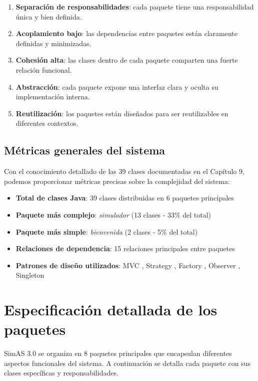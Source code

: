 \begin{enumerate}
    \item \textbf{Separación de responsabilidades}: cada paquete tiene una responsabilidad única y bien definida.
    \item \textbf{Acoplamiento bajo}: las dependencias entre paquetes están claramente definidas y minimizadas.
    \item \textbf{Cohesión alta}: las clases dentro de cada paquete comparten una fuerte relación funcional.
    \item \textbf{Abstracción}: cada paquete expone una interfaz clara y oculta su implementación interna.
    \item \textbf{Reutilización}: los paquetes están diseñados para ser reutilizables en diferentes contextos.
\end{enumerate}

\subsection{Métricas generales del sistema}

Con el conocimiento detallado de las 39 clases documentadas en el Capítulo 9, podemos proporcionar métricas precisas sobre la complejidad del sistema:

\begin{itemize}
    \item \textbf{Total de clases Java}: 39 clases distribuidas en 6 paquetes principales
    \item \textbf{Paquete más complejo}: \textit{simulador} (13 clases - 33\% del total)
    \item \textbf{Paquete más simple}: \textit{bienvenida} (2 clases - 5\% del total)
    \item \textbf{Relaciones de dependencia}: 15 relaciones principales entre paquetes
    \item \textbf{Patrones de diseño utilizados}: MVC \cite{mvc-pattern, mvc-web}, Strategy \cite{strategy-pattern, strategy-web}, Factory \cite{factory-pattern, factory-web}, Observer \cite{observer-pattern, observer-web}, Singleton \cite{singleton-pattern, singleton-web}
\end{itemize}

\section{Especificación detallada de los paquetes}

SimAS 3.0 se organiza en 8 paquetes principales que encapsulan diferentes aspectos funcionales del sistema. A continuación se detalla cada paquete con sus clases específicas y responsabilidades.


